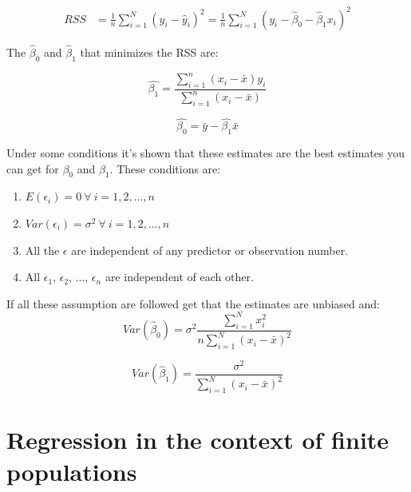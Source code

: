 \documentclass{article}
\begin{document}
\begin{align*}
  RSS &= \frac{1}{n} \sum_{i = 1}^N \left( y_i - \hat{y}_i \right)^2 
  = \frac{1}{n} \sum_{i = 1}^N \left( y_i - \hat{\beta}_0 - \hat{\beta}_1 x_i \right)^2
\end{align*}

The \(\hat{\beta}_0\) and \(\hat{\beta}_1\) that minimizes the RSS are:

\begin{equation*}
 \hat{\beta_1} = \frac{\sum_{i = 1}^n\left( x_i - \bar{x} \right) y_i}{\sum_{i = 1}^n\left( x_i - \bar{x} \right)} 
\end{equation*}

\begin{equation*}
 \hat{\beta_0} = \bar{y} - \hat{\beta_1}\bar{x} 
\end{equation*}

Under some conditions it's shown that these estimates are the best estimates
you can get for \(\beta_0\) and \(\beta_1\). These conditions are:

\begin{enumerate}
\item \(E \left( \epsilon_i \right) = 0\ \forall \ i = 1, 2, ..., n\)
\item \(Var \left( \epsilon_i \right) = \sigma^2\ \forall \ i = 1, 2, ..., n\)
\item All the \(\epsilon\) are independent of any predictor or observation number.
\item All \(\epsilon_1\), \(\epsilon_2\), ..., \(\epsilon_n\) are independent of each other.
\end{enumerate}

If all these assumption are followed get that the estimates are unbiased and:
\begin{equation*}
  Var \left( \hat{\beta}_0 \right) = \sigma^2 \frac{\sum_{i = 1}^N x_i^2}{n
    \sum_{i = 1}^N \left( x_i - \bar{x} \right)^2}
\end{equation*}
  

\begin{equation*}
  Var \left( \hat{\beta}_1 \right) = \frac{\sigma^2}{
    \sum_{i = 1}^N \left( x_i - \bar{x} \right)^2}
\end{equation*}

\section{Regression in the context of finite populations}
\end{document}
